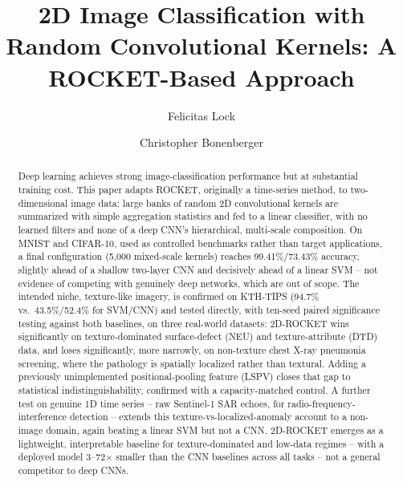 \documentclass[a4paper,fleqn]{cas-sc}
\begin{document}
\let\WriteBookmarks\relax
\def\floatpagepagefraction{1}
\def\textpagefraction{.001}

\title[mode=title]{2D Image Classification with Random Convolutional Kernels: A ROCKET-Based Approach}

\author[1]{Felicitas Lock}
\cormark[1]


\author[1]{Christopher Bonenberger}


\begin{abstract}
Deep learning achieves strong image-classification performance but at substantial training cost. This paper adapts ROCKET, originally a time-series method, to two-dimensional image data: large banks of random 2D convolutional kernels are summarized with simple aggregation statistics and fed to a linear classifier, with no learned filters and none of a deep CNN's hierarchical, multi-scale composition. On MNIST and CIFAR-10, used as controlled benchmarks rather than target applications, a final configuration (5,000 mixed-scale kernels) reaches 99.41\%/73.43\% accuracy, slightly ahead of a shallow two-layer CNN and decisively ahead of a linear SVM -- not evidence of competing with genuinely deep networks, which are out of scope. The intended niche, texture-like imagery, is confirmed on KTH-TIPS (94.7\% vs.\ 43.5\%/52.4\% for SVM/CNN) and tested directly, with ten-seed paired significance testing against both baselines, on three real-world datasets: 2D-ROCKET wins significantly on texture-dominated surface-defect (NEU) and texture-attribute (DTD) data, and loses significantly, more narrowly, on non-texture chest X-ray pneumonia screening, where the pathology is spatially localized rather than textural. Adding a previously unimplemented positional-pooling feature (LSPV) closes that gap to statistical indistinguishability, confirmed with a capacity-matched control. A further test on genuine 1D time series -- raw Sentinel-1 SAR echoes, for radio-frequency-interference detection -- extends this texture-vs-localized-anomaly account to a non-image domain, again beating a linear SVM but not a CNN. 2D-ROCKET emerges as a lightweight, interpretable baseline for texture-dominated and low-data regimes -- with a deployed model 3--72$\times$ smaller than the CNN baselines across all tasks -- not a general competitor to deep CNNs.
\end{abstract}
\end{document}

